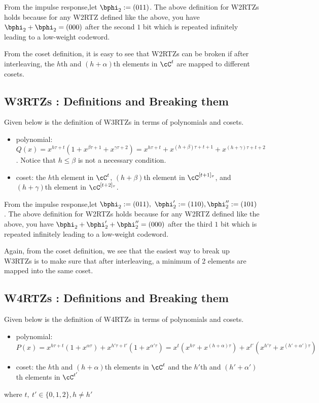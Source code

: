 From the impulse response,let $\bphi_2:=(0 1 1)$. The above definition for W2RTZs holds because for any W2RTZ defined like the above, you have $\bphi_2+\bphi_2=(0 0 0)$ after the second $1$ bit which is repeated infinitely leading to a low-weight codeword.


From the coset definition, it is easy to see that W2RTZs can be broken if after interleaving,  the $h$th and $(h+\alpha)$th elements in $\cC^t$ are mapped to different cosets.

\subsection{W3RTZs : Definitions and Breaking them}
Given below is the definition of W3RTZs in terms of polynomials and cosets.
\begin{itemize}
	\item polynomial: $Q(x) =x^{h\tau+t}(1+x^{\beta \tau +1}+x^{\gamma \tau +2})=x^{h\tau+t}+x^{(h+\beta) \tau +t+1}+x^{(h+\gamma) \tau +t+2}$. 
	Notice that $h \leq \beta$ is not a necessary condition.
	\item coset: the $h$th element in $\cC^{t}$, $(h+\beta)$th element in $\cC^{[t+1]_\tau}$, and $(h+\gamma)$th element in $\cC^{[t+2]_\tau}$.
\end{itemize}

From the impulse response,let $\bphi_2:=(0 1 1),~\bphi_2':=(1 1 0),\bphi_2'':=(1 0 1)$. The above definition for W2RTZs holds because for any W2RTZ defined like the above, you have $\bphi_2+\bphi_2'+\bphi_2''=(0 0 0)$ after the third $1$ bit which is repeated infinitely leading to a low-weight codeword.

Again, from the coset definition, we see that the easiest way to break up W3RTZs is to make sure that after interleaving, a minimum of 2 elements are mapped into the same coset.

\subsection{W4RTZs : Definitions and Breaking them}
Given below is the definition of W4RTZs in terms of polynomials and cosets.
\begin{itemize}
	\item polynomial: $P(x)=x^{h\tau+t}(1+x^{\alpha \tau}) + x^{h'\tau+t'}(1+x^{\alpha' \tau})= x^t(x^{h\tau}+x^{(h+\alpha)\tau}) + x^{t'}(x^{h'\tau}+x^{(h'+\alpha')\tau})$
	\item coset: the $h$th and $(h+\alpha)$th elements in $\cC^t$ and  the $h'$th and $(h'+\alpha')$th elements in $\cC^{t'}$ 
\end{itemize}
where $t,~t' \in\{0,1,2\},h \neq h'$

